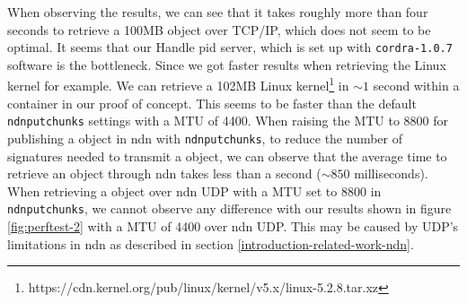 When observing the results, we can see that it takes roughly more than four seconds to retrieve a 100MB object over TCP/IP, which does not seem to be optimal. 
It seems that our Handle \gls{pid} server, which is set up with \texttt{cordra-1.0.7} software is the bottleneck. Since we got faster results when retrieving the Linux kernel for example. We can retrieve a 102MB Linux kernel\footnote{https://cdn.kernel.org/pub/linux/kernel/v5.x/linux-5.2.8.tar.xz} in ${\sim}1$ second within a container in our proof of concept. This seems to be faster than the default \texttt{ndnputchunks} settings with a MTU of 4400. When raising the MTU to 8800 for publishing a object in \gls{ndn} with \texttt{ndnputchunks}, to reduce the number of signatures needed to transmit a object, we can observe that the average time to retrieve an object through \gls{ndn} takes less than a second (${\sim}850$ milliseconds). 
When retrieving a object over \gls{ndn} UDP with a MTU set to 8800 in \texttt{ndnputchunks}, we cannot observe any difference with our results shown in figure \ref{fig:perftest-2} with a MTU of 4400 over \gls{ndn} UDP. This may be caused by UDP's limitations in \gls{ndn} as described in section \ref{introduction-related-work-ndn}. 



